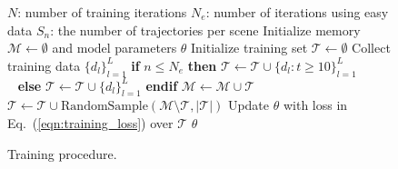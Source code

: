 \begin{wrapfigure}{r}{0.55\textwidth}
\vspace{-2em}
\begin{minipage}{0.55\textwidth}
\begin{algorithm}[H]
\caption{Training procedure.}
\label{alg:training}
\begin{algorithmic}
\small
\State $N$: number of training iterations
\State $N_{e}$: number of iterations using easy data
\State $S_n$: the number of trajectories per scene
\State Initialize memory $\mathcal{M} \leftarrow \emptyset$ and model parameters $\theta$
    \State Initialize training set $\mathcal{T} \leftarrow \emptyset$
            \State Collect training data $\{d_l\}_{l=1}^L$
            \State \textbf{if} $n \leq N_e$ \textbf{then} $\mathcal{T} \leftarrow  \mathcal{T} \cup \{d_l: t \geq 10\}_{l=1}^L$ \\ \qquad\qquad~ \textbf{else} $\mathcal{T} \leftarrow \mathcal{T} \cup \{d_l\}_{l=1}^L$ \textbf{endif}
        \EndFor
    \EndFor
    \State $\mathcal{M} \leftarrow \mathcal{M} \cup \mathcal{T}$
    \State $\mathcal{T} \leftarrow \mathcal{T} \cup \text{RandomSample}(\mathcal{M} \setminus \mathcal{T}, |\mathcal{T}|)$
        \State Update $\theta$ with loss in Eq.~(\ref{eqn:training_loss}) over $\mathcal{T}$
    \EndFor
\EndFor
\State \Return $\theta$
\end{algorithmic}
\end{algorithm}
\end{minipage}
\vspace{-10pt}
\end{wrapfigure}